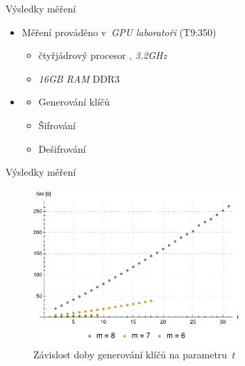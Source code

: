 \documentclass{beamer}
\begin{document}
\begin{frame}{Výsledky měření}
    \begin{itemize}

        \item Měření prováděno v~\emph{GPU laboratoři} (T9:350)
            \begin{itemize}
                \item čtyřjádrový procesor , \emph{3.2\;GHz}
                \item \emph{16\;GB RAM} DDR3
            \end{itemize}

        \item {}
            \begin{itemize}
                \item Generování klíčů
                \item Šifrování
                \item Dešifrování
            \end{itemize}

    \end{itemize}
\end{frame}

\begin{frame}{Výsledky měření}

    \begin{figure}[!ht]
        \centering
        \includegraphics[width=0.7\textwidth]{../../implementace/grafy/listplot_m6-8_generovani.pdf}
        \caption[Časová složitost generování klíčů]{
            Závislost doby generování klíčů na parametru~$t$
        }
        \label{obr_mereni_t_gen}
    \end{figure}

\end{frame}
\end{document}
